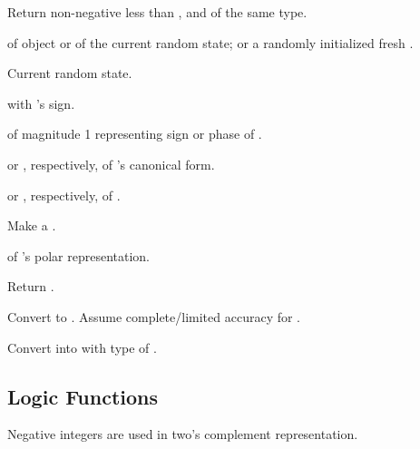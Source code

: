 \begin{LIST}{1cm}
  {
    Return non-negative  less than ,
    and of the same type.
  }

  {
     of  object  or of
    the current random state; or a randomly initialized fresh .
  }

  {
    Current random state.
  }

  {
   with 's sign.
  }

  { of magnitude 1
  representing sign or phase of .
  }

  {
   or , respectively, of
  's canonical form.
  }

  {
   or , respectively, of .
  }

  {
    Make a .
  }

  {
     of 's polar representation.
  }

  {
    Return .
  }

  {
  Convert  to . Assume complete/limited accuracy for .
  }

  {
  Convert  into  with type of .
  }

\end{LIST}


\subsection{Logic Functions}
\label{section:Logic Functions}
Negative integers are used in
two's complement representation.

